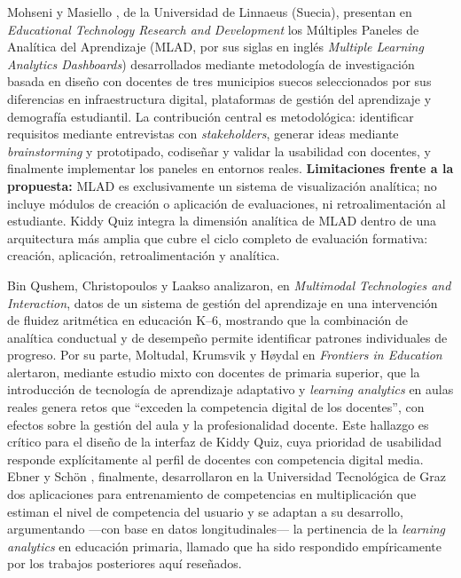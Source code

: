 Mohseni y Masiello \cite{mohseni2025mlad}, de la Universidad de Linnaeus (Suecia), presentan en \textit{Educational Technology Research and Development} los Múltiples Paneles de Analítica del Aprendizaje (MLAD, por sus siglas en inglés \textit{Multiple Learning Analytics Dashboards}) desarrollados mediante metodología de investigación basada en diseño con docentes de tres municipios suecos seleccionados por sus diferencias en infraestructura digital, plataformas de gestión del aprendizaje y demografía estudiantil. La contribución central es metodológica: identificar requisitos mediante entrevistas con \textit{stakeholders}, generar ideas mediante \textit{brainstorming} y prototipado, codiseñar y validar la usabilidad con docentes, y finalmente implementar los paneles en entornos reales. \textbf{Limitaciones frente a la propuesta:} MLAD es exclusivamente un sistema de visualización analítica; no incluye módulos de creación o aplicación de evaluaciones, ni retroalimentación al estudiante. Kiddy Quiz integra la dimensión analítica de MLAD dentro de una arquitectura más amplia que cubre el ciclo completo de evaluación formativa: creación, aplicación, retroalimentación y analítica.

Bin Qushem, Christopoulos y Laakso \cite{binqushem2022lmsanalytics} analizaron, en \textit{Multimodal Technologies and Interaction}, datos de un sistema de gestión del aprendizaje en una intervención de fluidez aritmética en educación K--6, mostrando que la combinación de analítica conductual y de desempeño permite identificar patrones individuales de progreso. Por su parte, Moltudal, Krumsvik y Høydal \cite{moltudal2022adaptive} en \textit{Frontiers in Education} alertaron, mediante estudio mixto con docentes de primaria superior, que la introducción de tecnología de aprendizaje adaptativo y \textit{learning analytics} en aulas reales genera retos que ``exceden la competencia digital de los docentes'', con efectos sobre la gestión del aula y la profesionalidad docente. Este hallazgo es crítico para el diseño de la interfaz de Kiddy Quiz, cuya prioridad de usabilidad responde explícitamente al perfil de docentes con competencia digital media. Ebner y Schön \cite{ebner2013whymatters}, finalmente, desarrollaron en la Universidad Tecnológica de Graz dos aplicaciones para entrenamiento de competencias en multiplicación que estiman el nivel de competencia del usuario y se adaptan a su desarrollo, argumentando ---con base en datos longitudinales--- la pertinencia de la \textit{learning analytics} en educación primaria, llamado que ha sido respondido empíricamente por los trabajos posteriores aquí reseñados.

